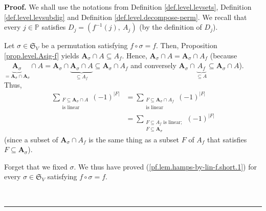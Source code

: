 \documentclass[numbers=enddot,12pt,final,onecolumn,notitlepage]{scrartcl}%
\numberwithin{exer}{section}
\theoremstyle{definition}
\newenvironment{proof}[1][Proof]{\noindent\textbf{#1.} }{\ \rule{0.5em}{0.5em}}
\let\sumnonlimits\sum
\renewcommand{\sum}{\sumnonlimits\limits}
\newenvironment{vershort}{}{}
\begin{document}
\begin{vershort}


\begin{proof}
We shall use the notations from Definition \ref{def.level.levsets}, Definition
\ref{def.level.levsubdig} and Definition \ref{def.level.decompose-perm}. We
recall that every $j\in\mathbb{P}$ satisfies $D_{j}=\left(  f^{-1}\left(
j\right)  ,\ A_{j}\right)  $ (by the definition of $D_{j}$).

Let $\sigma\in\mathfrak{S}_{V}$ be a permutation satisfying $f\circ\sigma=f$.
Then, Proposition \ref{prop.level.Asig-f} yields $\mathbf{A}_{\sigma}\cap
A\subseteq A_{f}$. Hence, $\mathbf{A}_{\sigma}\cap A=\mathbf{A}_{\sigma}\cap
A_{f}$ (because $\underbrace{\mathbf{A}_{\sigma}}_{=\mathbf{A}_{\sigma}%
\cap\mathbf{A}_{\sigma}}\cap A=\mathbf{A}_{\sigma}\cap\underbrace{\mathbf{A}%
_{\sigma}\cap A}_{\subseteq A_{f}}\subseteq\mathbf{A}_{\sigma}\cap A_{f}$ and
conversely $\mathbf{A}_{\sigma}\cap\underbrace{A_{f}}_{\subseteq A}%
\subseteq\mathbf{A}_{\sigma}\cap A$). Thus,%
\begin{align}
\sum_{\substack{F\subseteq\mathbf{A}_{\sigma}\cap A\\\text{is linear}}}\left(
-1\right)  ^{\left\vert F\right\vert }  &  =\sum_{\substack{F\subseteq
\mathbf{A}_{\sigma}\cap A_{f}\\\text{is linear}}}\left(  -1\right)
^{\left\vert F\right\vert }\nonumber\\
&  =\sum_{\substack{F\subseteq A_{f}\text{ is linear};\\F\subseteq
\mathbf{A}_{\sigma}}}\left(  -1\right)  ^{\left\vert F\right\vert }
\label{pf.lem.hamps-by-lin-f.short.1}%
\end{align}
(since a subset of $\mathbf{A}_{\sigma}\cap A_{f}$ is the same thing as a
subset $F$ of $A_{f}$ that satisfies $F\subseteq\mathbf{A}_{\sigma}$).

Forget that we fixed $\sigma$. We thus have proved
(\ref{pf.lem.hamps-by-lin-f.short.1}) for every $\sigma\in\mathfrak{S}_{V}$
satisfying $f\circ\sigma=f$.


\end{proof}
\end{vershort}
\end{document}
